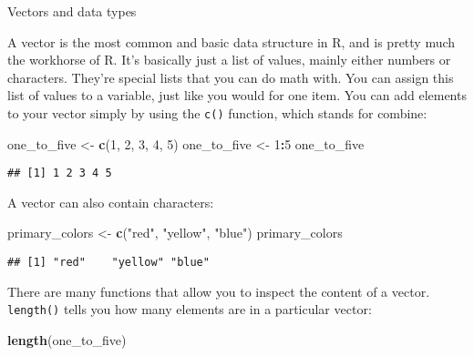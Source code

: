 \documentclass[
  11pt,
  ignorenonframetext,
]{beamer}
\newenvironment{Shaded}{\begin{snugshade}}{\end{snugshade}}
\newcommand{\DecValTok}[1]{\textcolor[rgb]{0.00,0.00,0.81}{#1}}
\newcommand{\KeywordTok}[1]{\textcolor[rgb]{0.13,0.29,0.53}{\textbf{#1}}}
\newcommand{\NormalTok}[1]{#1}
\newcommand{\OperatorTok}[1]{\textcolor[rgb]{0.81,0.36,0.00}{\textbf{#1}}}
\newcommand{\StringTok}[1]{\textcolor[rgb]{0.31,0.60,0.02}{#1}}
\begin{document}
\begin{frame}[fragile]{Vectors and data types}
\protect\hypertarget{vectors-and-data-types}{}

A vector is the most common and basic data structure in R, and is pretty
much the workhorse of R. It's basically just a list of values, mainly
either numbers or characters. They're special lists that you can do math
with. You can assign this list of values to a variable, just like you
would for one item. You can add elements to your vector simply by using
the \texttt{c()} function, which stands for combine:

\begin{Shaded}
\begin{Highlighting}[]
\NormalTok{one_to_five <-}\StringTok{ }\KeywordTok{c}\NormalTok{(}\DecValTok{1}\NormalTok{, }\DecValTok{2}\NormalTok{, }\DecValTok{3}\NormalTok{, }\DecValTok{4}\NormalTok{, }\DecValTok{5}\NormalTok{)}
\NormalTok{one_to_five <-}\StringTok{ }\DecValTok{1}\OperatorTok{:}\DecValTok{5}
\NormalTok{one_to_five}
\end{Highlighting}
\end{Shaded}

\begin{verbatim}
## [1] 1 2 3 4 5
\end{verbatim}

A vector can also contain characters:

\begin{Shaded}
\begin{Highlighting}[]
\NormalTok{primary_colors <-}\StringTok{ }\KeywordTok{c}\NormalTok{(}\StringTok{"red"}\NormalTok{, }\StringTok{"yellow"}\NormalTok{, }\StringTok{"blue"}\NormalTok{)}
\NormalTok{primary_colors}
\end{Highlighting}
\end{Shaded}

\begin{verbatim}
## [1] "red"    "yellow" "blue"
\end{verbatim}

There are many functions that allow you to inspect the content of a
vector. \texttt{length()} tells you how many elements are in a
particular vector:

\begin{Shaded}
\begin{Highlighting}[]
\KeywordTok{length}\NormalTok{(one_to_five)}
\end{Highlighting}
\end{Shaded}


\end{frame}
\end{document}
